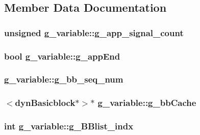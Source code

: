 \subsection{Member Data Documentation}
\hypertarget{structg__variable_a8065e226bc2987122b831ffc1d58052a}{
\subsubsection[{g\_\-app\_\-signal\_\-count}]{\setlength{\rightskip}{0pt plus 5cm}unsigned {\bf g\_\-variable::g\_\-app\_\-signal\_\-count}}}
\label{structg__variable_a8065e226bc2987122b831ffc1d58052a}
\hypertarget{structg__variable_ac0ace8e752b855d8a33cd9c9a5d62511}{
\subsubsection[{g\_\-appEnd}]{\setlength{\rightskip}{0pt plus 5cm}bool {\bf g\_\-variable::g\_\-appEnd}}}
\label{structg__variable_ac0ace8e752b855d8a33cd9c9a5d62511}
\hypertarget{structg__variable_a690c0db6b4c6d4ded41f24f25c011ca9}{
\subsubsection[{g\_\-bb\_\-seq\_\-num}]{ {\bf g\_\-variable::g\_\-bb\_\-seq\_\-num}}}
\label{structg__variable_a690c0db6b4c6d4ded41f24f25c011ca9}
\hypertarget{structg__variable_a4e0c87db4791200f634d9730ec5dd419}{
\subsubsection[{g\_\-bbCache}]{$<${\bf dynBasicblock}$\ast$$>$$\ast$ {\bf g\_\-variable::g\_\-bbCache}}}
\label{structg__variable_a4e0c87db4791200f634d9730ec5dd419}
\hypertarget{structg__variable_a383af2308cefc8a72db47b1d7a41a702}{
\subsubsection[{g\_\-BBlist\_\-indx}]{\setlength{\rightskip}{0pt plus 5cm}int {\bf g\_\-variable::g\_\-BBlist\_\-indx}}}
